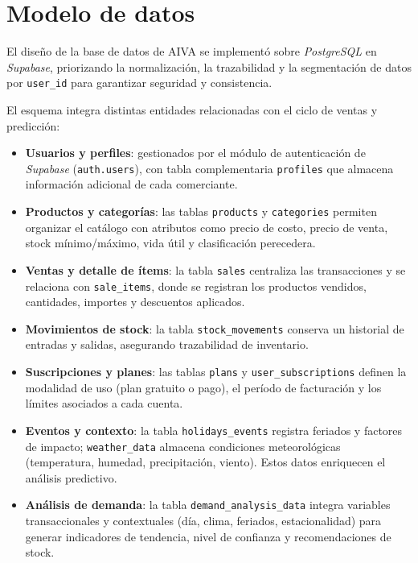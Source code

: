 \section{Modelo de datos}

El diseño de la base de datos de AIVA se implementó sobre \textit{PostgreSQL} en \textit{Supabase}, priorizando la normalización, la trazabilidad y la segmentación de datos por \texttt{user\_id} para garantizar seguridad y consistencia.

El esquema integra distintas entidades relacionadas con el ciclo de ventas y predicción:

\begin{itemize}
    \item \textbf{Usuarios y perfiles}: gestionados por el módulo de autenticación de \textit{Supabase} (\texttt{auth.users}), con tabla complementaria \texttt{profiles} que almacena información adicional de cada comerciante.
    \item \textbf{Productos y categorías}: las tablas \texttt{products} y \texttt{categories} permiten organizar el catálogo con atributos como precio de costo, precio de venta, stock mínimo/máximo, vida útil y clasificación perecedera.
    \item \textbf{Ventas y detalle de ítems}: la tabla \texttt{sales} centraliza las transacciones y se relaciona con \texttt{sale\_items}, donde se registran los productos vendidos, cantidades, importes y descuentos aplicados.
    \item \textbf{Movimientos de stock}: la tabla \texttt{stock\_movements} conserva un historial de entradas y salidas, asegurando trazabilidad de inventario.
    \item \textbf{Suscripciones y planes}: las tablas \texttt{plans} y \texttt{user\_subscriptions} definen la modalidad de uso (plan gratuito o pago), el período de facturación y los límites asociados a cada cuenta.
    \item \textbf{Eventos y contexto}: la tabla \texttt{holidays\_events} registra feriados y factores de impacto; \texttt{weather\_data} almacena condiciones meteorológicas (temperatura, humedad, precipitación, viento). Estos datos enriquecen el análisis predictivo.
    \item \textbf{Análisis de demanda}: la tabla \texttt{demand\_analysis\_data} integra variables transaccionales y contextuales (día, clima, feriados, estacionalidad) para generar indicadores de tendencia, nivel de confianza y recomendaciones de stock.
\end{itemize}

